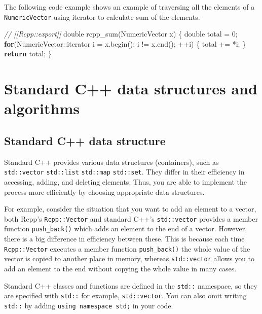 \documentclass[
]{book}
\newenvironment{Shaded}{\begin{snugshade}}{\end{snugshade}}
\newcommand{\CommentTok}[1]{\textcolor[rgb]{0.56,0.35,0.01}{\textit{#1}}}
\newcommand{\ControlFlowTok}[1]{\textcolor[rgb]{0.13,0.29,0.53}{\textbf{#1}}}
\newcommand{\DataTypeTok}[1]{\textcolor[rgb]{0.13,0.29,0.53}{#1}}
\newcommand{\DecValTok}[1]{\textcolor[rgb]{0.00,0.00,0.81}{#1}}
\newcommand{\NormalTok}[1]{#1}
\begin{document}
The following code example shows an example of traversing all the elements of a \texttt{NumericVector} using iterator to calculate sum of the elements.

\begin{Shaded}
\begin{Highlighting}[]
\CommentTok{// [[Rcpp::export]]}
\DataTypeTok{double}\NormalTok{ rcpp_sum(NumericVector x) \{}
  \DataTypeTok{double}\NormalTok{ total = }\DecValTok{0}\NormalTok{;}
  \ControlFlowTok{for}\NormalTok{(NumericVector::iterator i = x.begin(); i != x.end(); ++i) \{}
\NormalTok{    total += *i;}
\NormalTok{  \}}
  \ControlFlowTok{return}\NormalTok{ total;}
\NormalTok{\}}
\end{Highlighting}
\end{Shaded}

\hypertarget{standard-c-data-structures-and-algorithms}{%
\chapter{Standard C++ data structures and algorithms}\label{standard-c-data-structures-and-algorithms}}

\hypertarget{standard-c-data-structure}{%
\section{Standard C++ data structure}\label{standard-c-data-structure}}

Standard C++ provides various data structures (containers), such as \texttt{std::vector} \texttt{std::list} \texttt{std::map} \texttt{std::set}. They differ in their efficiency in accessing, adding, and deleting elements. Thus, you are able to implement the process more efficiently by choosing appropriate data structures.

For example, consider the situation that you want to add an element to a vector, both Rcpp's \texttt{Rcpp::Vector} and standard C++'s \texttt{std::vector} provides a member function \texttt{push\_back()} which adds an element to the end of a vector. However, there is a big difference in efficiency between these. This is because each time \texttt{Rcpp::Vector} executes a member function \texttt{push\_back()} the whole value of the vector is copied to another place in memory, whereas \texttt{std::vector} allows you to add an element to the end without copying the whole value in many cases.

Standard C++ classes and functions are defined in the \texttt{std::} namespace, so they are specified with \texttt{std::} for example, \texttt{std::vector}. You can also omit writing \texttt{std::} by adding \texttt{using\ namespace\ std;} in your code.
\end{document}
